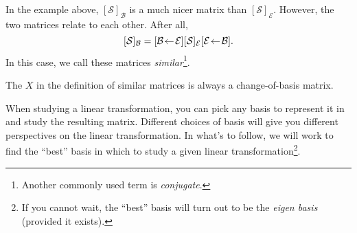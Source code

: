 In the example above, $[\mathcal S]_{\mathcal B}$ is a much nicer matrix than $[\mathcal S]_{\mathcal E}$. However, the
two matrices relate to each other. After all,
\[
	[\mathcal S]_{\mathcal B}=\BasisChange{\mathcal E}{\mathcal B}[\mathcal S]_{\mathcal E}\BasisChange{\mathcal B}{\mathcal E}.
\]
In this case, we call these matrices \emph{similar}\footnote{ Another commonly used term is \emph{conjugate}.}.


The $X$ in the definition of similar matrices is always a change-of-basis matrix. 

When studying a linear transformation, you can pick any basis to represent it in and study the resulting
matrix. Different choices of basis will give you different perspectives on the linear transformation.
In what's to follow, we will work to find the ``best'' basis in which to study a given linear transformation\footnote{ If you
cannot wait, the ``best'' basis will turn out to be the \emph{eigen basis} (provided it exists).}.
